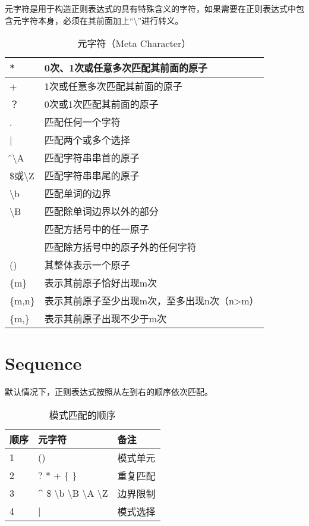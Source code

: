 元字符是用于构造正则表达式的具有特殊含义的字符，如果需要在正则表达式中包含元字符本身，必须在其前面加上“\textbackslash ”进行转义。



\begin{table}
\centering
\caption{元字符（Meta Character）}
\begin{tabular}{|l|l|}
\hline
* & 0次、1次或任意多次匹配其前面的原子\\
\hline
+ & 1次或任意多次匹配其前面的原子\\
\hline
？ & 0次或1次匹配其前面的原子\\
\hline
. & 匹配任何一个字符\\
\hline
| & 匹配两个或多个选择\\
\hline
\^或\textbackslash A& 匹配字符串串首的原子\\
\hline
\$或\textbackslash Z&匹配字符串串尾的原子\\
\hline
\textbackslash b&匹配单词的边界\\
\hline
\textbackslash B & 匹配除单词边界以外的部分\\
\hline
[] & 匹配方括号中的任一原子\\
\hline
[\^] & 匹配除方括号中的原子外的任何字符\\
\hline
() & 其整体表示一个原子\\
\hline
\{m\}& 表示其前原子恰好出现m次\\
\hline
\{m,n\} & 表示其前原子至少出现m次，至多出现n次（n>m）\\
\hline
\{m,\}& 表示其前原子出现不少于m次\\
\hline
\end{tabular}

\end{table}


\section{Sequence}

默认情况下，正则表达式按照从左到右的顺序依次匹配。

\begin{table}
\centering
\caption{模式匹配的顺序}
\begin{tabular}{|l|l|l|}
\hline
顺序 & 元字符 & 备注\\
\hline
1 & () & 模式单元\\
\hline
2 & ? * + \{ \} & 重复匹配\\
\hline
3 & \^{} \$ \textbackslash b \textbackslash B \textbackslash A \textbackslash Z & 边界限制\\
\hline
4 & | & 模式选择\\
\hline
\end{tabular}
\end{table}


